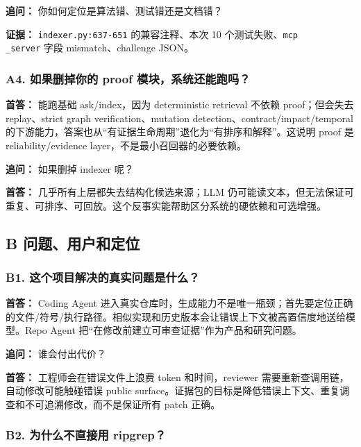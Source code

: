 \documentclass[UTF8,12pt,openany]{ctexbook}
\begin{document}
\textbf{追问：} 你如何定位是算法错、测试错还是文档错？\par

\textbf{证据：} \texttt{indexer.py:637-651} 的兼容注释、本次 10 个测试失败、\texttt{mcp\\_server} 字段 mismatch、challenge JSON。\par

\subsubsection{A4. 如果删掉你的 proof 模块，系统还能跑吗？}

\textbf{首答：} 能跑基础 ask/index，因为 deterministic retrieval 不依赖 proof；但会失去 replay、strict graph verification、mutation detection、contract/impact/temporal 的下游能力，答案也从“有证据生命周期”退化为“有排序和解释”。这说明 proof 是 reliability/evidence layer，不是最小召回器的必要依赖。\par

\textbf{追问：} 如果删掉 indexer 呢？\par

\textbf{首答：} 几乎所有上层都失去结构化候选来源；LLM 仍可能读文本，但无法保证可重复、可排序、可回放。这个反事实能帮助区分系统的硬依赖和可选增强。\par

\subsection{B 问题、用户和定位}

\subsubsection{B1. 这个项目解决的真实问题是什么？}

\textbf{首答：} Coding Agent 进入真实仓库时，生成能力不是唯一瓶颈；首先要定位正确的文件/符号/执行路径。相似实现和历史版本会让错误上下文被高置信度地送给模型。Repo Agent 把“在修改前建立可审查证据”作为产品和研究问题。\par

\textbf{追问：} 谁会付出代价？\par

\textbf{首答：} 工程师会在错误文件上浪费 token 和时间，reviewer 需要重新查调用链，自动修改可能触碰错误 public surface。证据包的目标是降低错误上下文、重复调查和不可追溯修改，而不是保证所有 patch 正确。\par

\subsubsection{B2. 为什么不直接用 ripgrep？}
\end{document}
